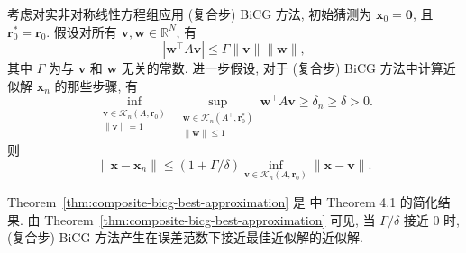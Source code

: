 \begin{Theorem}[\BookCite{16}]\label{thm:composite-bicg-best-approximation}
{考虑对实非对称线性方程组应用 (复合步) BiCG 方法, 初始猜测为 $\bm x_0=\bm0$, 且 $\bm r_0^{*}=\bm r_0$. 假设对所有 $\bm v,\bm w\in\mathbb R^N$, 有}
\[|\bm w^{\top}A\bm v|\le\Gamma\|\bm v\|\|\bm w\|,\]
{其中 $\Gamma$ 为与 $\bm v$ 和 $\bm w$ 无关的常数. 进一步假设, 对于 (复合步) BiCG 方法中计算近似解 $\bm x_n$ 的那些步骤, 有}
\[\inf_{\substack{\bm v\in\mathcal K_n(A,\bm r_0)\\\|\bm v\|=1}}\ \sup_{\substack{\bm w\in\mathcal K_n(A^{\top},\bm r_0^{*})\\\|\bm w\|\le1}}\bm w^{\top}A\bm v\ge\delta_n\ge\delta>0.\]
{则}
\[\|\bm x-\bm x_n\|\le(1+\Gamma/\delta)\inf_{\bm v\in\mathcal K_n(A,\bm r_0)}\|\bm x-\bm v\|.\]
\end{Theorem}
{Theorem\ \ref{thm:composite-bicg-best-approximation} 是  中 Theorem 4.1 的简化结果. 由 Theorem\ \ref{thm:composite-bicg-best-approximation} 可见, 当 $\Gamma/\delta$ 接近 0 时, (复合步) BiCG 方法产生在误差范数下接近最佳近似解的近似解.}
